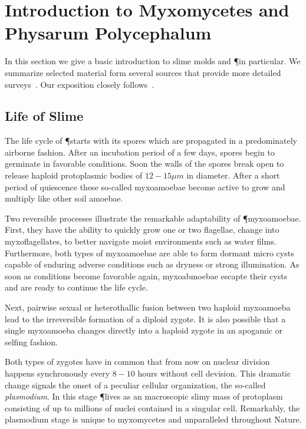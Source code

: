 \section{Introduction to Myxomycetes and Physarum Polycephalum}

In this section we give a basic introduction to slime molds and \P in particular. We summarize selected material form several sources that provide more detailed surveys~\cite{nowotny2000myxomyceten,grube2016physarum,Sauer1986,Mayne2016,howard1931life}. Our exposition closely follows~\cite{nowotny2000myxomyceten}.

\subsection{Life of Slime}

The life cycle of \P starts with its spores which are propagated in a predominately airborne fashion. After an incubation period of a few days, spores begin to germinate in favorable conditions. Soon the walls of the spores break open to release haploid protoplasmic bodies of $12-15 \mu m$ in diameter. After a short period of quiescence these so-called myxoamoebae become active to grow and multiply like other soil amoebae. 

Two reversible processes illustrate the remarkable adaptability of \P myxoamoebae. First, they have the ability to quickly grow one or two flagellae, \ie change into myxoflagellates, to better navigate moist environments such as water films. Furthermore, both types of myxoamoebae are able to form dormant micro cysts capable of enduring adverse conditions such as dryness or strong illumination. As soon as conditions become favorable again, myxoabmoebae escapte their cysts and are ready to continue the life cycle.

Next, pairwise sexual or heterothallic fusion between two haploid myxoamoeba lead to the irreversible formation of a diploid zygote. It is also possible that a single myxoamoeba changes directly into a haploid zygote in an apogamic or selfing fashion.

Both types of zygotes have in common that from now on nuclear division happens synchronously every $8-10$ hours without cell devision. This dramatic change signals the onset of a peculiar cellular organization, the so-called \emph{plasmodium}. In this stage \P lives as an macroscopic slimy mass of protoplasm consisting of up to millions of nuclei contained in a singular cell. Remarkably, the plasmodium stage is unique to myxomycetes and unparalleled throughout Nature.

